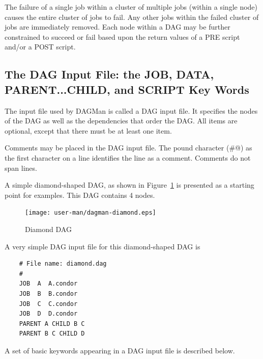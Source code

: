 The failure of a single job within a cluster
of multiple jobs
(within a single node)
causes the entire cluster of jobs to fail.
Any other jobs within the failed cluster of jobs are
immediately removed.
Each node within a DAG may be further constrained  to succeed or fail
based upon the return values of a PRE script and/or a POST script.

\subsection{The DAG Input File: the JOB, DATA, PARENT...CHILD, and SCRIPT Key Words}

The input file used by DAGMan is called a DAG input file.
It specifies the nodes of the DAG as well as the dependencies
that order the DAG.
All items are optional, except that there must be at least one 
item.

Comments may be placed in the DAG input file.
The pound character (\verb@#@) as the first character on a
line identifies the line as a comment.
Comments do not span lines.

A simple diamond-shaped DAG, as shown in
Figure~\ref{fig:dagman-diamond}
is presented as a starting point for examples.
This DAG contains 4 nodes.

\begin{figure}[hbt]
\centering
\texttt{[image: user-man/dagman-diamond.eps]}
\caption{\label{fig:dagman-diamond}Diamond DAG}
\end{figure}


A very simple DAG input file for this diamond-shaped DAG is

\footnotesize
\begin{verbatim}
    # File name: diamond.dag
    #
    JOB  A  A.condor 
    JOB  B  B.condor 
    JOB  C  C.condor	
    JOB  D  D.condor
    PARENT A CHILD B C
    PARENT B C CHILD D
\end{verbatim}
\normalsize

A set of basic keywords appearing in a DAG input file is described below.

